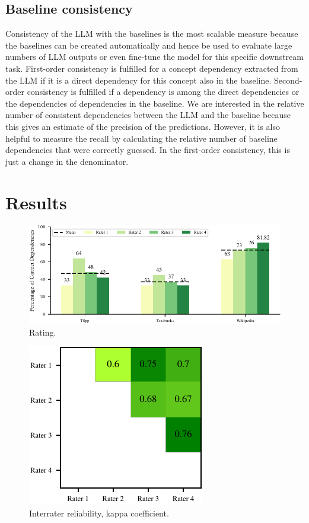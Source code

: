 \documentclass{article}
\begin{document}
\subsection{Baseline consistency}
Consistency of the LLM with the baselines is the most scalable measure because the baselines can be created automatically and hence be used to evaluate large numbers of LLM outputs or even fine-tune the model for this specific downstream task. First-order consistency is fulfilled for a concept dependency extracted from the LLM if it is a direct dependency for this concept also in the baseline. Second-order consistency is fulfilled if a dependency is among the direct dependencies or the dependencies of dependencies in the baseline. We are interested in the relative number of consistent dependencies between the LLM and the baseline because this gives an estimate of the precision of the predictions. However, it is also helpful to measure the recall by calculating the relative number of baseline dependencies that were correctly guessed. In the first-order consistency, this is just a change in the denominator. 

\section{Results}



\begin{figure}[H]
    \centering
    \includegraphics[width=.95\textwidth]{img/rating.pdf}
    \caption{Rating.}
    \label{fig:rating}
\end{figure}

\begin{figure}[H]
    \centering
    \includegraphics[width=.4\textwidth]{img/kappa.pdf}
    \caption{Interrater reliability, kappa coefficient.}
    \label{fig:kappa}
\end{figure}
\end{document}
